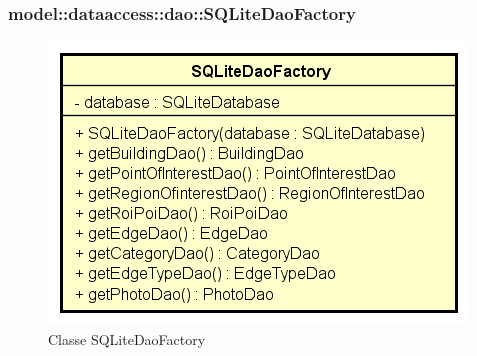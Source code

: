\documentclass[../DefinizioneDiProdotto.tex]{subfiles}
\begin{document}
\subsubsection{model::dataaccess::dao::SQLiteDaoFactory}

    \begin{figure}[H]
        \centering
        \includegraphics{img/SQLiteDaoFactory.png}
        \caption{Classe SQLiteDaoFactory}\label{fig:model::dataaccess::dao::SQLiteDaoFactory} 
    \end{figure}
\end{document}
